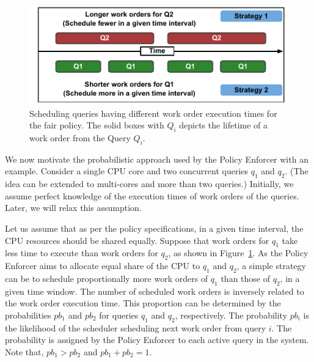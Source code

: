 \begin{figure}[]
	\centering
	\includegraphics[width=\columnwidth]{figures/Probability-explanation.pdf}
	\vspace{-2em}
	\caption{Scheduling queries having different work order execution times for the fair policy. The solid boxes with $Q_{i}$ depicts the lifetime of a work order from the Query $Q_{i}$.}
	\label{fig:probability-explanation}
\end{figure}

We now motivate the probabilistic approach used by the Policy Enforcer with an example.
Consider a single CPU core and two concurrent queries $q_{1}$ and $q_{2}$. 
(The idea can be extended to multi-cores and more than two queries.)
Initially, we assume perfect knowledge of the execution times of work orders of the queries. 
Later, we will relax this assumption. 

Let us assume that as per the policy specifications, in a given time interval, the CPU resources should be shared equally. 
Suppose that work orders for $q_{1}$ take less time to execute than work orders for 
$q_{2}$, as shown in Figure~\ref{fig:probability-explanation}.
As the Policy Enforcer aims to allocate equal share of the CPU to $q_1$ and $q_2$, a simple strategy can be to schedule proportionally more work orders of $q_{1}$  than those of $q_{2}$, in a given time window. 
The number of scheduled work orders is inversely related to the work order execution 
time. 
This proportion can be determined by the probabilities $pb_{1}$ and $pb_{2}$ for queries $q_1$ and $q_2$, respectively.
The probability $pb_i$ is the likelihood of the scheduler scheduling next work order from query $i$. 
The probability is assigned by the Policy Enforcer to each active query in the system.
Note that, $pb_{1} > pb_{2}$ and $pb_{1} + pb_{2} = 1$.


